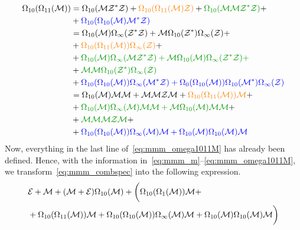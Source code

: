 \documentclass[12pt, a4paper, twoside]{report}
\begin{document}
\begin{align}
  \begin{aligned}
    \Omega_{10}(\Omega_{11}(\M)) &= \Omega_{10}(\M\Zstar\Z) + \textcolor{orange}{\Omega_{10}(\Omega_{11}(\M)\Z)} + \textcolor{green}{\Omega_{10}(\M\M\Zstar\Z)} +\\
    &+\textcolor{blue}{\Omega_{10}(\Omega_{10}(\M)\Mstar\Z)}\\
    &= \Omega_{10}(\M)\Omega_\infty(\Zstar\Z) + \M\Omega_{10}(\Zstar)\Omega_\infty(\Z) +\\
    &+ \textcolor{orange}{\Omega_{10}(\Omega_{11}(\M))\Omega_\infty(\Z)} +\\
    &+ \textcolor{green}{\Omega_{10}(\M)\Omega_\infty(\M\Zstar\Z) + \M\Omega_{10}(\M)\Omega_\infty(\Zstar\Z) +}\\
    &+ \textcolor{green}{\M\M\Omega_{10}(\Zstar)\Omega_\infty(\Z)}\\
    &+ \textcolor{blue}{\Omega_{10}(\Omega_{10}(\M))\Omega_\infty(\Mstar\Z) + \Omega_0(\Omega_{10}(\M))\Omega_{10}(\Mstar)\Omega_\infty(\Z)}\\
    &= \Omega_{10}(\M)\M\M + \M\M\Z\M + \textcolor{orange}{\Omega_{10}(\Omega_{11}(\M))\M} +\\
    &+ \textcolor{green}{\Omega_{10}(\M)\Omega_\infty(\M)\M\M + \M\Omega_{10}(\M)\M\M} +\\
    &+ \textcolor{green}{\M\M\M\Z\M} +\\
    &+ \textcolor{blue}{\Omega_{10}(\Omega_{10}(\M))\Omega_\infty(\M)\M + \Omega_{10}(\M)\Omega_{10}(\M)\M}
  \end{aligned}
      \label{eq:mmm_omega1011M}
\end{align}
Now, everything in the last line of~\eqref{eq:mmm_omega1011M} has already been defined. Hence, with the information in~\eqref{eq:mmm_m}--\eqref{eq:mmm_omega1011M}, we transform~\eqref{eq:mmm_combspec} into the following expression.
\begin{align}
  \begin{aligned}
  &\mathcal{E} + \mathcal{M} + (\mathcal{M} + \mathcal{E})\Omega_{10}(\mathcal{M}) +\bigg(\Omega_{10}(\Omega_1(\mathcal{M}))\mathcal{M} +\\
     &+\Omega_{10}(\Omega_{11}(\mathcal{M}))\mathcal{M} +\Omega_{10}(\Omega_{10}(\mathcal{M}))\Omega_\infty(\mathcal{M})\mathcal{M} + \Omega_{10}(\mathcal{M})\Omega_{10}(\mathcal{M})\mathcal{M}\bigg)
   \end{aligned}
\label{eq:mmm_combspec_final}
\end{align}
\end{document}
